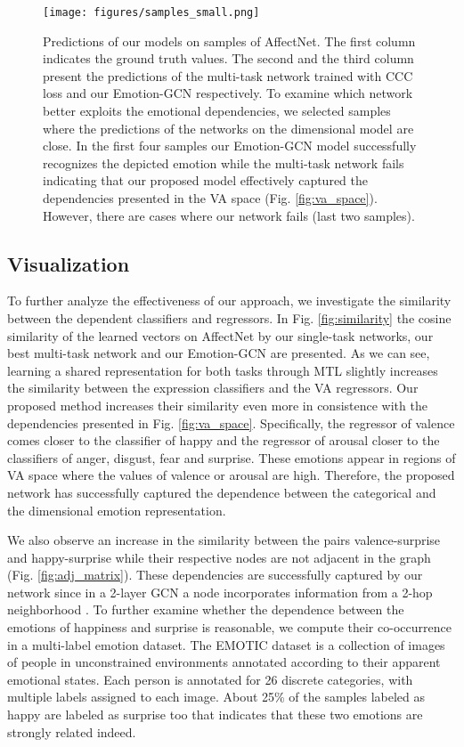 \documentclass[a4paper, 10pt, conference]{ieeeconf}      \usepackage{FG2021}
\begin{document}
\begin{figure*}[t]
    \centering
    \texttt{[image: figures/samples\_small.png]}
    \caption{Predictions of our models on samples of AffectNet. The first column indicates the ground truth values. The second and the third column present the predictions of the multi-task network trained with CCC loss and our Emotion-GCN respectively. To examine which network better exploits the emotional dependencies, we selected samples where the predictions of the networks on the dimensional model are close. In the first four samples our Emotion-GCN model successfully recognizes the depicted emotion while the multi-task network fails indicating that our proposed model effectively captured the dependencies presented in the VA space (Fig. \ref{fig:va_space}). However, there are cases where our network fails (last two samples).}
    \label{fig:samples}
\end{figure*}

\subsection{Visualization}

To further analyze the effectiveness of our approach, we investigate the similarity between the dependent classifiers and regressors. In Fig. \ref{fig:similarity} the cosine similarity of the learned vectors on AffectNet by our single-task networks, our best multi-task network and our Emotion-GCN are presented. As we can see, learning a shared representation for both tasks through MTL slightly increases the similarity between the expression classifiers and the VA regressors. Our proposed method increases their similarity even more in consistence with the dependencies presented in Fig. \ref{fig:va_space}. Specifically, the regressor of valence comes closer to the classifier of happy and the regressor of arousal closer to the classifiers of anger, disgust, fear and surprise. These emotions appear in regions of VA space where the values of valence or arousal are high. Therefore, the proposed network has successfully captured the dependence between the categorical and the dimensional emotion representation.

We also observe an increase in the similarity between the pairs valence-surprise and happy-surprise while their respective nodes are not adjacent in the graph (Fig. \ref{fig:adj_matrix}). These dependencies are successfully captured by our network since in a 2-layer GCN a node incorporates information from a 2-hop neighborhood \cite{derr2018signed}. To further examine whether the dependence between the emotions of happiness and surprise is reasonable, we compute their co-occurrence in a multi-label emotion dataset. The EMOTIC dataset \cite{kosti2017emotic} is a collection of images of people in unconstrained environments annotated according to their apparent emotional states. Each person is annotated for 26 discrete categories, with multiple labels assigned to each image. About 25\% of the samples labeled as happy are labeled as surprise too that indicates that these two emotions are strongly related indeed.
\end{document}

